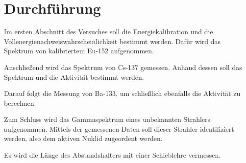 \section{Durchführung}
\label{sec:durchführung}

Im ersten Abschnitt des Versuches soll die Energiekalibration und die Vollenergienachweiswahrscheinlichkeit
bestimmt werden. Dafür wird das Spektrum von kalibriertem Eu-152 aufgenommen.

Anschließend wird das Spektrum von Cs-137 gemessen. Anhand dessen soll das Spektrum und die Aktivität bestimmt werden.

Darauf folgt die Messung von Ba-133, um schließlich ebenfalls die Aktivität zu berechnen.

Zum Schluss wird das Gammaspektrum eines unbekannten Strahlers aufgenommen.
Mittels der gemessenen Daten soll dieser Strahler identifiziert werden, also dem aktiven 
Nuklid zugeordent werden.

Es wird die Länge des Abstandshalters mit einer Schieblehre vermessen.